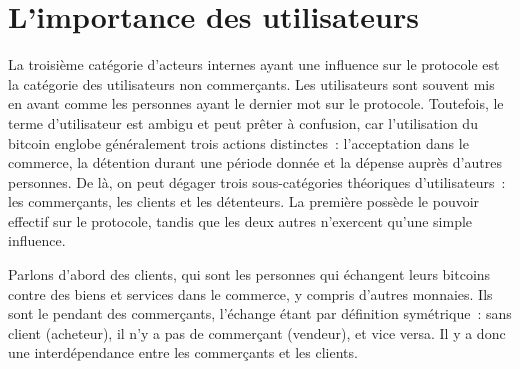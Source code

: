 \section*{L'importance des utilisateurs}

La troisième catégorie d'acteurs internes ayant une influence sur le protocole est la catégorie des utilisateurs non commerçants. Les utilisateurs sont souvent mis en avant comme les personnes ayant le dernier mot sur le protocole. Toutefois, le terme d'utilisateur est ambigu et peut prêter à confusion, car l'utilisation du bitcoin englobe généralement trois actions distinctes~: l'acceptation dans le commerce, la détention durant une période donnée et la dépense auprès d'autres personnes. De là, on peut dégager trois sous-catégories théoriques d'utilisateurs~: les commerçants, les clients et les détenteurs. La première possède le pouvoir effectif sur le protocole, tandis que les deux autres n'exercent qu'une simple influence.


Parlons d'abord des clients, qui sont les personnes qui échangent leurs bitcoins contre des biens et services dans le commerce, y compris d'autres monnaies. Ils sont le pendant des commerçants, l'échange étant par définition symétrique~: sans client (acheteur), il n'y a pas de commerçant (vendeur), et vice versa. Il y a donc une interdépendance entre les commerçants et les clients. %

